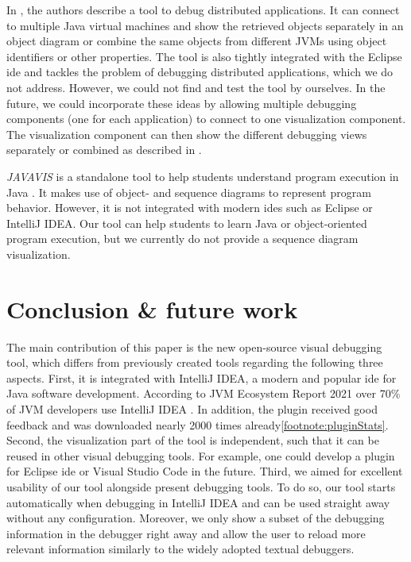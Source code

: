 \documentclass[conference]{IEEEtran}
\newcommand{\intellij}{IntelliJ IDEA}
\begin{document}
In \cite{kochGraphicalDebuggingDistributed2015}, the authors describe a tool to debug distributed applications.
It can connect to multiple Java virtual machines and show the retrieved objects separately in an object diagram or combine the same objects from different JVMs using object identifiers or other properties.
The tool is also tightly integrated with the Eclipse \gls*{ide} and tackles the problem of debugging distributed applications, which we do not address.
However, we could not find and test the tool by ourselves.
In the future, we could incorporate these ideas by allowing multiple debugging components (one for each application) to connect to one visualization component.
The visualization component can then show the different debugging views separately or combined as described in \cite{kochGraphicalDebuggingDistributed2015}.

\textit{JAVAVIS} is a standalone tool to help students understand program execution in Java \cite{oechsleJAVAVISAutomaticProgram2002}.
It makes use of object- and sequence diagrams to represent program behavior.
However, it is not integrated with modern \glspl*{ide} such as Eclipse or \intellij{}.
Our tool can help students to learn Java or object-oriented program execution, but we currently do not provide a sequence diagram visualization.

\section{Conclusion \& future work} \label{sec:conclusion}
The main contribution of this paper is the new open-source visual debugging tool, which differs from previously created tools regarding the following three aspects.
First, it is integrated with \intellij{}, a modern and popular \gls*{ide} for Java software development.
According to JVM Ecosystem Report 2021 over 70\% of JVM developers use \intellij{}  \cite{JVMEcosystemReport2021}.
In addition, the plugin received good feedback and was downloaded nearly 2000 times already\cref{footnote:pluginStats}.
Second, the visualization part of the tool is independent, such that it can be reused in other visual debugging tools.
For example, one could develop a plugin for Eclipse \gls*{ide} or Visual Studio Code in the future.
Third, we aimed for excellent usability of our tool alongside present debugging tools.
To do so, our tool starts automatically when debugging in \intellij{} and can be used straight away without any configuration.
Moreover, we only show a subset of the debugging information in the debugger right away and allow the user to reload more relevant information similarly to the widely adopted textual debuggers.
\end{document}

